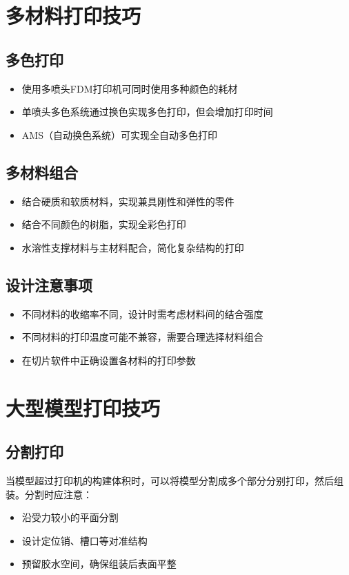 \documentclass[12pt,UTF8]{ctexbook}
\begin{document}
\section{多材料打印技巧}

\subsection{多色打印}
\begin{itemize}
\item 使用多喷头FDM打印机可同时使用多种颜色的耗材
\item 单喷头多色系统通过换色实现多色打印，但会增加打印时间
\item AMS（自动换色系统）可实现全自动多色打印
\end{itemize}

\subsection{多材料组合}
\begin{itemize}
\item 结合硬质和软质材料，实现兼具刚性和弹性的零件
\item 结合不同颜色的树脂，实现全彩色打印
\item 水溶性支撑材料与主材料配合，简化复杂结构的打印
\end{itemize}

\subsection{设计注意事项}
\begin{itemize}
\item 不同材料的收缩率不同，设计时需考虑材料间的结合强度
\item 不同材料的打印温度可能不兼容，需要合理选择材料组合
\item 在切片软件中正确设置各材料的打印参数
\end{itemize}

\section{大型模型打印技巧}

\subsection{分割打印}
当模型超过打印机的构建体积时，可以将模型分割成多个部分分别打印，然后组装。分割时应注意：
\begin{itemize}
\item 沿受力较小的平面分割
\item 设计定位销、槽口等对准结构
\item 预留胶水空间，确保组装后表面平整
\end{itemize}
\end{document}
